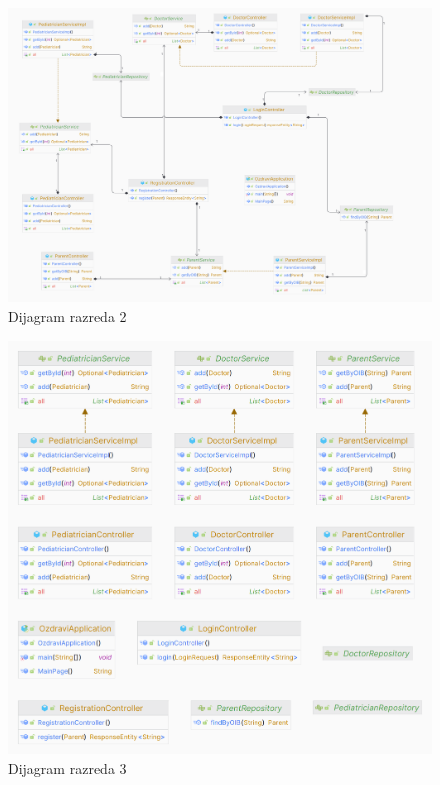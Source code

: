 			\begin{figure}[H]
				\includegraphics[scale=0.225]{dijagrami/dijraz2.PNG} %
				\centering
				\caption{Dijagram razreda 2}
				\label{fig:dijraz2}
			\end{figure} 
			
			\begin{figure}[H]
				\includegraphics[scale=0.225]{dijagrami/dijraz3.PNG} %
				\centering
				\caption{Dijagram razreda 3}
				\label{fig:dijraz3}
			\end{figure}
			
